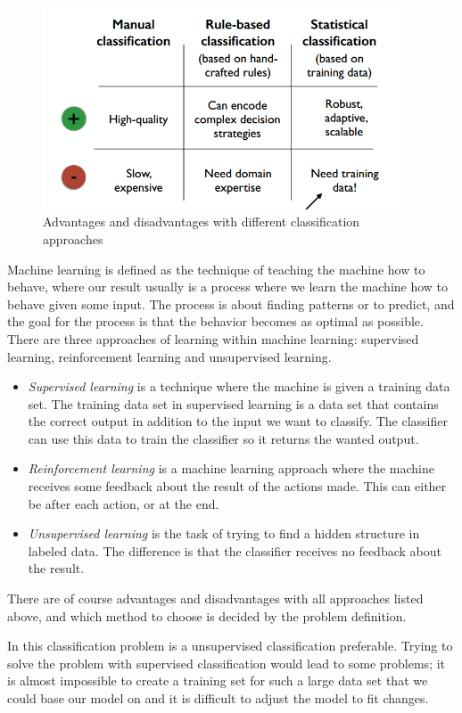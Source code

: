 \documentclass[11pt,english,a4paper]{article}
\begin{document}
\begin{figure}
\centering
\includegraphics[height=6cm]{classification_approaches}
\caption{Advantages and disadvantages with different classification approaches}
\label{fig:classification_approaches}
\end{figure}
Machine learning is defined as the technique of teaching the machine how to behave, where our result usually is a process where we learn the machine how to behave given some input. The process is about finding patterns or to predict, and the goal for the process is that the behavior becomes as optimal as possible. 
There are three approaches of learning within machine learning: supervised learning, reinforcement learning and unsupervised learning. 
\begin{itemize}
\item \textit{Supervised learning} is a technique where the machine is given a training data set. The training data set in supervised learning is a data set that contains the correct output in addition to the input we want to classify. The classifier can use this data to train the classifier so it returns the wanted output.
\item \textit{Reinforcement learning} is a machine learning approach where the machine receives some feedback about the result of the actions made.   This can either be after each action, or at the end. 
\item \textit{Unsupervised learning} is the task of trying to find a hidden structure in labeled data. The difference is that the classifier receives no feedback about the result. 
\end{itemize}
There are of course advantages and disadvantages with all approaches listed above, and which method to choose is decided by the problem definition.

In this classification problem is a unsupervised classification preferable. Trying to solve the problem with supervised classification would lead to some problems; it is almost impossible to create a training set for such a large data set that we could base our model on and it is difficult to adjust the model to fit changes. 
\end{document}
